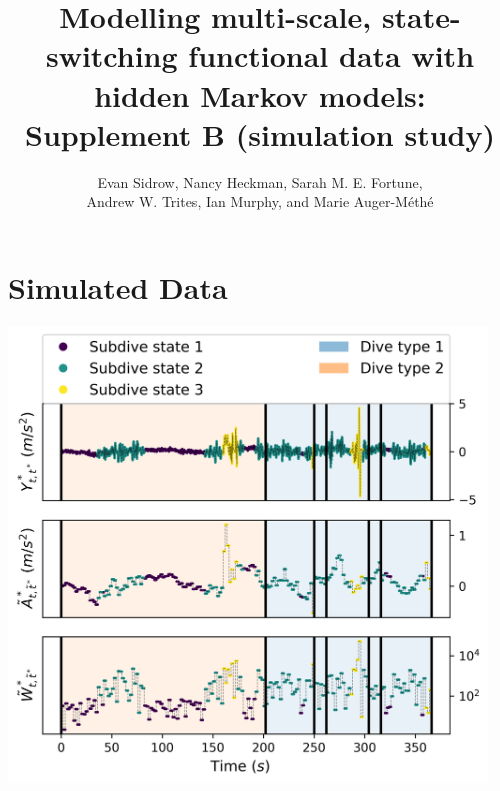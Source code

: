 \documentclass{article}
\begin{document}



\title{Modelling multi-scale, state-switching functional data with hidden Markov models: Supplement B (simulation study)}
\date{}
\author{Evan Sidrow, Nancy Heckman, Sarah M. E. Fortune, \\ Andrew W. Trites, Ian Murphy, and Marie Auger-M\'eth\'e}


\maketitle

\addtocounter{tablenum}{1}
\addtocounter{fignum}{1}


    \section{Simulated Data}
    
        \begin{center}
    	\includegraphics[width=5in]{../Plots/sim_data.png}
    	\end{center}
    	
\end{document}
